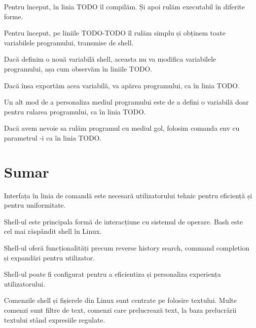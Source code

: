 Pentru început, în linia TODO îl compilăm. Și apoi rulăm executabil în diferite forme.

Pentru început, pe liniile TODO-TODO îl rulăm simplu și obținem toate variabilele programului, transmise de shell.

Dacă definim o nouă variabilă shell, aceasta nu va modifica variabilele programului, așa cum observăm în liniile TODO.

Dacă însa exportăm acea variabilă, va apărea programului, ca în linia TODO.

Un alt mod de a personaliza mediul programului este de a defini o variabilă doar pentru rularea programului, ca în linia TODO.

Dacă avem nevoie sa rulăm programul cu mediul gol, folosim comanda env cu parametrul -i ca în linia TODO.

\section{Sumar}
\label{sec:cli-summary}

Interfața în linia de comandă este necesară utilizatorului tehnic pentru eficiență și pentru uniformitate.

Shell-ul este principala formă de interacțiune cu sistemul de operare. Bash este cel mai răspândit shell în Linux.

Shell-ul oferă funcționalități precum reverse history search, command completion și expandări pentru utilizator.

Shell-ul poate fi configurat pentru a eficientiza și personaliza experiența utilizatorului.

Comenzile shell și fișierele din Linux sunt centrate pe folosire textului. Multe
comenzi sunt filtre de text, comenzi care prelucrează text, la baza prelucrării
textului stând expresiile regulate.
